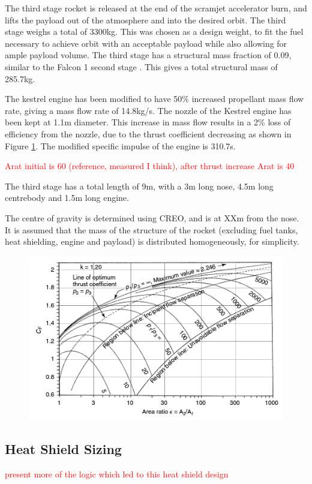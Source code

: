 	The third stage rocket is released at the end of the scramjet accelerator burn, and lifts the payload out of the atmosphere and into the desired orbit. The third stage weighs a total of 3300kg. This was chosen as a design weight, to fit the fuel necessary to achieve orbit with an acceptable payload while also allowing for ample payload volume. The third stage has a structural mass fraction of 0.09, similar to the Falcon 1 second stage \cite{Vehicle2008}. This gives a total structural mass of 285.7kg. 
	
	

	
The kestrel engine has been modified to have 50\% increased propellant mass flow rate, giving a mass flow rate of 14.8kg/s. The nozzle of the Kestrel engine has been kept at 1.1m diameter. This increase in mass flow results in a 2\% loss of efficiency from the nozzle\cite{RPE}, due to the thrust coefficient decreasing as shown in Figure \ref{fig:ThrustCoefficient-Arat}. The modified specific impulse of the engine is 310.7s.

\textcolor{red}{Arat initial is 60 (reference, measured I think), after thrust increase Arat is 40}

The third stage has a total length of 9m, with a 3m long nose, 4.5m long centrebody and 1.5m long engine.
	
	The centre of gravity is determined using CREO, and is at XXm from the nose. It is assumed that the mass of the structure of the rocket (excluding fuel tanks, heat shielding, engine and payload) is distributed homogeneously, for simplicity.
	
	
	\begin{figure}
\centering
\includegraphics[width=0.7\linewidth]{"figures/3_vehicle_design/Thrust Coefficient - Arat"}
\caption{\cite{RPE}}
\label{fig:ThrustCoefficient-Arat}
\end{figure}



\subsection{Heat Shield Sizing}
\textcolor{red}{present more of the logic which led to this heat shield design}

